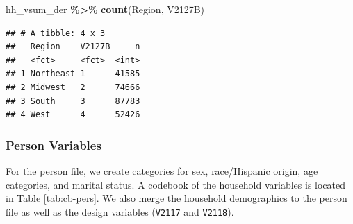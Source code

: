 \documentclass[
]{krantz}
\makeatletter
\newenvironment{Shaded}{\begin{snugshade}}{\end{snugshade}}
\newcommand{\FunctionTok}[1]{\textcolor[rgb]{0.27,0.27,0.27}{\textbf{#1}}}
\newcommand{\NormalTok}[1]{#1}
\newcommand{\SpecialCharTok}[1]{\textcolor[rgb]{0.43,0.43,0.43}{\textbf{#1}}}
\newenvironment{kframe}{%
\medskip{}
\setlength{\fboxsep}{.8em}
 \def\at@end@of@kframe{}%
 \ifinner\ifhmode%
  \def\at@end@of@kframe{\end{minipage}}%
  \begin{minipage}{\columnwidth}%
 \fi\fi%
 \def\FrameCommand##1{\hskip\@totalleftmargin \hskip-\fboxsep
 \colorbox{shadecolor}{##1}\hskip-\fboxsep
     \hskip-\linewidth \hskip-\@totalleftmargin \hskip\columnwidth}%
 \MakeFramed {\advance\hsize-\width
   \@totalleftmargin\z@ \linewidth\hsize
   \@setminipage}}%
 {\par\unskip\endMakeFramed%
 \at@end@of@kframe}
\renewenvironment{Shaded}{\begin{kframe}}{\end{kframe}}
\makeatother
\begin{document}
\begin{Shaded}
\begin{Highlighting}[]
\NormalTok{hh\_vsum\_der }\SpecialCharTok{\%\textgreater{}\%} \FunctionTok{count}\NormalTok{(Region, V2127B)}
\end{Highlighting}
\end{Shaded}

\begin{verbatim}
## # A tibble: 4 x 3
##   Region    V2127B     n
##   <fct>     <fct>  <int>
## 1 Northeast 1      41585
## 2 Midwest   2      74666
## 3 South     3      87783
## 4 West      4      52426
\end{verbatim}

\hypertarget{person-variables}{%
\subsubsection{Person Variables}\label{person-variables}}

For the person file, we create categories for sex, race/Hispanic origin, age categories, and marital status. A codebook of the household variables is located in Table \ref{tab:cb-pers}. We also merge the household demographics to the person file as well as the design variables (\texttt{V2117} and \texttt{V2118}).
\end{document}

